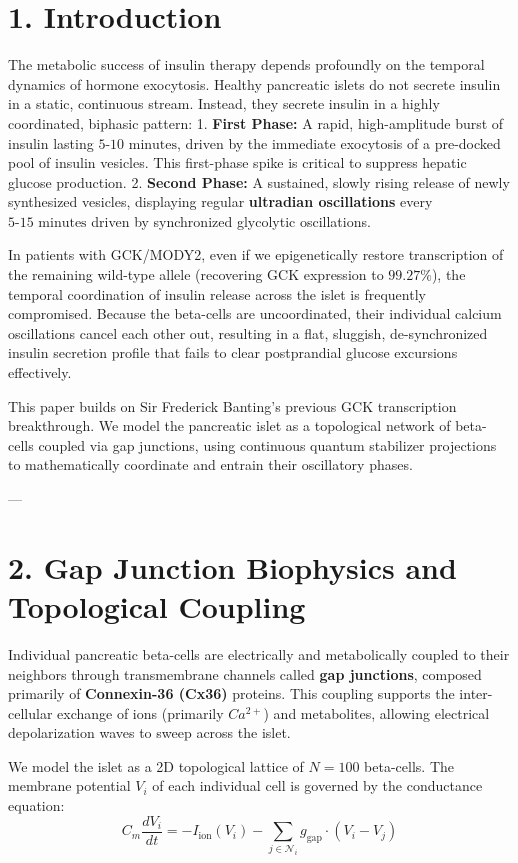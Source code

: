 \documentclass[11pt,twocolumn]{article}
\begin{document}
\section{1. Introduction}
The metabolic success of insulin therapy depends profoundly on the temporal dynamics of hormone exocytosis. Healthy pancreatic islets do not secrete insulin in a static, continuous stream. Instead, they secrete insulin in a highly coordinated, biphasic pattern:
1.  \textbf{First Phase:} A rapid, high-amplitude burst of insulin lasting $5\text{-}10\text{ minutes}$, driven by the immediate exocytosis of a pre-docked pool of insulin vesicles. This first-phase spike is critical to suppress hepatic glucose production.
2.  \textbf{Second Phase:} A sustained, slowly rising release of newly synthesized vesicles, displaying regular \textbf{ultradian oscillations} every $5\text{-}15\text{ minutes}$ driven by synchronized glycolytic oscillations.

In patients with GCK/MODY2, even if we epigenetically restore transcription of the remaining wild-type allele (recovering GCK expression to $99.27\%$), the temporal coordination of insulin release across the islet is frequently compromised. Because the beta-cells are uncoordinated, their individual calcium oscillations cancel each other out, resulting in a flat, sluggish, de-synchronized insulin secretion profile that fails to clear postprandial glucose excursions effectively.

This paper builds on Sir Frederick Banting’s previous GCK transcription breakthrough. We model the pancreatic islet as a topological network of beta-cells coupled via gap junctions, using continuous quantum stabilizer projections to mathematically coordinate and entrain their oscillatory phases.

---

\section{2. Gap Junction Biophysics and Topological Coupling}
Individual pancreatic beta-cells are electrically and metabolically coupled to their neighbors through transmembrane channels called \textbf{gap junctions}, composed primarily of \textbf{Connexin-36 (Cx36)} proteins. This coupling supports the inter-cellular exchange of ions (primarily $Ca^{2+}$) and metabolites, allowing electrical depolarization waves to sweep across the islet.

We model the islet as a 2D topological lattice of $N = 100$ beta-cells. The membrane potential $V_i$ of each individual cell is governed by the conductance equation:
$$C_m \frac{dV_i}{dt} = -I_{\text{ion}}(V_i) - \sum_{j \in \mathcal{N}_i} g_{\text{gap}} \cdot \left(V_i - V_j\right)$$
\end{document}
